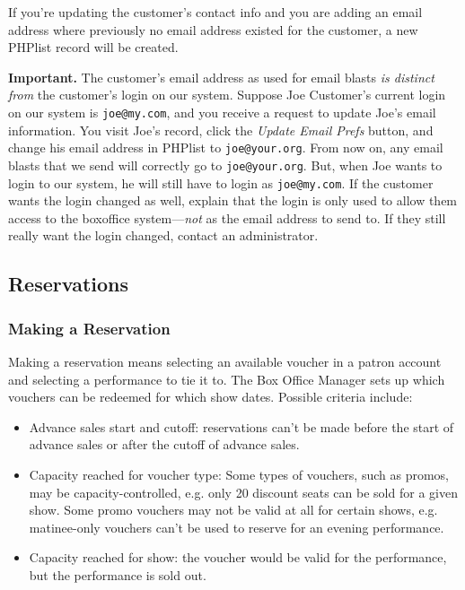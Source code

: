 If you're updating the customer's contact info and you are adding an
email address where previously no email address existed for the
customer, a new PHPlist record will be created.  

\textbf{Important.}  The customer's email address as used for email
blasts \emph{is distinct from} the customer's login on our system.
Suppose Joe Customer's current login on our system is \verb+joe@my.com+,
and you receive a request to update Joe's email information.  You visit
Joe's record, click the \emph{Update Email Prefs} button, and change his
email address in PHPlist to \verb+joe@your.org+.  From now on, any email
blasts that we send will correctly go to \verb+joe@your.org+.  But, when
Joe wants to login to our system, he will still have to login as
\verb+joe@my.com+.  If the customer wants the login changed as
well, explain that the login is only used to allow them access to the
boxoffice system---\emph{not} as the email address to send to.  If they
still really want the login changed, contact an administrator.


\subsection{Reservations}

\subsubsection{Making a Reservation}
\label{sec:reservation-details}

Making a reservation means selecting an available voucher in a patron
account and selecting a performance to tie it to.  The Box Office
Manager sets up which vouchers can be redeemed for which show dates.
Possible criteria include:

\begin{itemize}
\item Advance sales start and cutoff: reservations can't be made before
  the start of advance sales or after the cutoff of advance sales.
\item Capacity reached for voucher type: Some types of vouchers, such as
  promos, may be capacity-controlled, e.g. only 20 discount seats can be
  sold for a given show.  Some promo vouchers may not be valid at all
  for certain shows, e.g. matinee-only vouchers can't be used to reserve
  for an evening performance.
\item Capacity reached for show: the voucher would be valid for the
  performance, but the performance is sold out.
\end{itemize}


